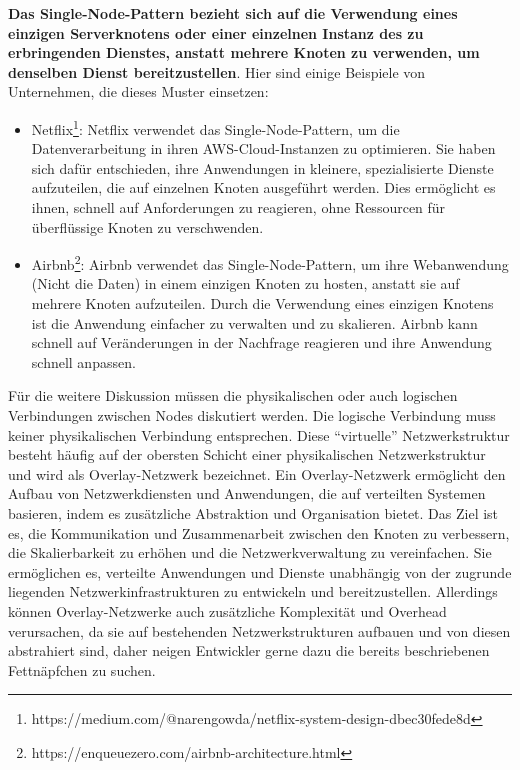 \documentclass[../vs-script-first-v01.tex]{subfiles}
\begin{document}
\textbf{Das Single-Node-Pattern bezieht sich auf die Verwendung eines einzigen Serverknotens oder einer einzelnen Instanz des zu erbringenden Dienstes, anstatt mehrere Knoten zu verwenden, um denselben Dienst bereitzustellen}. Hier sind einige Beispiele von Unternehmen, die dieses Muster einsetzen:
\begin{itemize}
\item Netflix\footnote{https://medium.com/@narengowda/netflix-system-design-dbec30fede8d}: Netflix verwendet das Single-Node-Pattern, um die Datenverarbeitung in ihren AWS-Cloud-Instanzen zu optimieren. Sie haben sich dafür entschieden, ihre Anwendungen in kleinere, spezialisierte Dienste aufzuteilen, die auf einzelnen Knoten ausgeführt werden. Dies ermöglicht es ihnen, schnell auf Anforderungen zu reagieren, ohne Ressourcen für überflüssige Knoten zu verschwenden.
\item Airbnb\footnote{https://enqueuezero.com/airbnb-architecture.html}: Airbnb verwendet das Single-Node-Pattern, um ihre Webanwendung (Nicht die Daten) in einem einzigen Knoten zu hosten, anstatt sie auf mehrere Knoten aufzuteilen. Durch die Verwendung eines einzigen Knotens ist die Anwendung einfacher zu verwalten und zu skalieren. Airbnb kann schnell auf Veränderungen in der Nachfrage reagieren und ihre Anwendung schnell anpassen.
\end{itemize}

Für die weitere Diskussion müssen die physikalischen oder auch logischen Verbindungen zwischen Nodes diskutiert werden. Die logische Verbindung muss keiner physikalischen Verbindung entsprechen. Diese \enquote{virtuelle} Netzwerkstruktur besteht häufig auf der obersten Schicht einer physikalischen Netzwerkstruktur und wird als Overlay-Netzwerk bezeichnet. Ein Overlay-Netzwerk ermöglicht den Aufbau von Netzwerkdiensten und Anwendungen, die auf verteilten Systemen basieren, indem es zusätzliche Abstraktion und Organisation bietet. Das Ziel ist es, die Kommunikation und Zusammenarbeit zwischen den Knoten zu verbessern, die Skalierbarkeit zu erhöhen und die Netzwerkverwaltung zu vereinfachen. Sie ermöglichen es, verteilte Anwendungen und Dienste unabhängig von der zugrunde liegenden Netzwerkinfrastrukturen zu entwickeln und bereitzustellen. Allerdings können Overlay-Netzwerke auch zusätzliche Komplexität und Overhead verursachen, da sie auf bestehenden Netzwerkstrukturen aufbauen und von diesen abstrahiert sind, daher neigen Entwickler gerne dazu die bereits beschriebenen Fettnäpfchen zu suchen.
\end{document}
